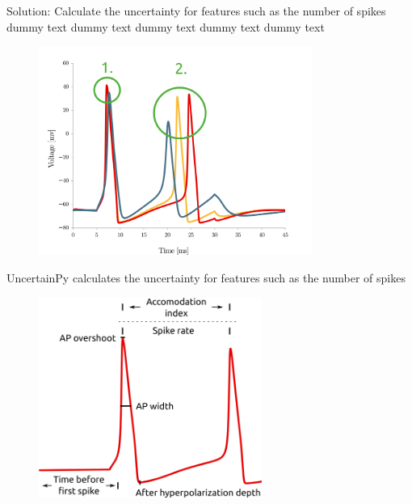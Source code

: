 \documentclass[presentation]{beamer}
\begin{document}
\begin{frame}{Solution: Calculate the uncertainty for features such as the number of spikes {\color{white} dummy text dummy text dummy text dummy text dummy text} }
\vspace{-5mm}
\begin{figure}
   \includegraphics[width=0.8\textwidth]{hh_features.png}
\end{figure}
\end{frame}

\begin{frame}{UncertainPy calculates the uncertainty for features such as the number of spikes}
\vspace{-5mm}
\begin{figure}
   \includegraphics[width=0.65\textwidth]{features.png}
\end{figure}
\end{frame}


\end{document}
